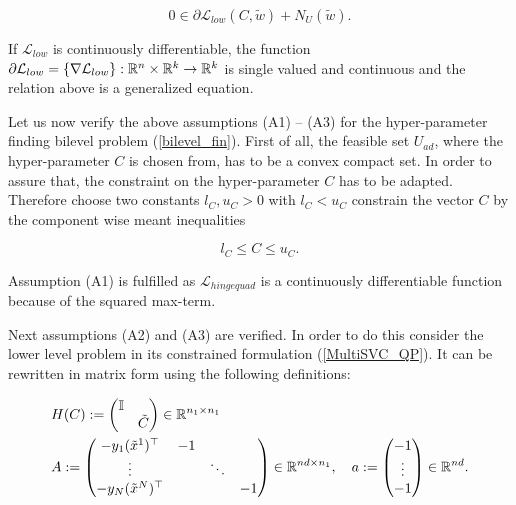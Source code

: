 \[ 0 \in \partial \mathcal{L}_{low}(C,\tilde{w}) + N_U(\tilde{w}). \]

If \(\mathcal{L}_{low}\) is continuously differentiable, the function \(\partial \mathcal{L}_{low} = \{\nabla \mathcal{L}_{low}\} : \mathbb{R}^n\times\mathbb{R}^k \to \mathbb{R}^k\) is single valued and continuous and the relation above is a generalized equation.


Let us now verify the above assumptions (A1) -- (A3) for the hyper-parameter finding bilevel problem (\ref{bilevel_fin}).
First of all, the feasible set \(U_{ad}\), where the hyper-parameter \(C\) is chosen from, has to be a convex compact set. In order to assure that, the constraint on the hyper-parameter \(C\) has to be adapted.
Therefore choose two constants \(l_C, u_C > 0\) with \(l_C < u_C\) constrain the vector \(C\) by the component wise meant inequalities

\[ l_C \leq C \leq u_C. \]

Assumption (A1) is fulfilled as \(\mathcal{L}_{hingequad}\) is a continuously differentiable function because of the squared max-term.

Next assumptions (A2) and (A3) are verified. In order to do this consider the lower level problem in its constrained formulation (\ref{MultiSVC_QP}).
It can be rewritten in matrix form using the following definitions:

\begin{equation*}
\begin{split}
	&H(C):= \begin{pmatrix} \mathbb{I} \\ & \tilde{C}\end{pmatrix}\in \mathbb{R}^{n_1\times n_1} \\
	&A := \begin{pmatrix}	-y_1(\tilde{x}^1)^{\top} & -1 \\
		\vdots & & \ddots \\ -y_N(\tilde{x}^N)^{\top} & & & -1\end{pmatrix} \in \mathbb{R}^{nd \times n_1}, \quad  a:= \begin{pmatrix}-1\\\vdots\\-1\end{pmatrix} \in \mathbb{R}^{nd}.
		\label{matrices}
\end{split}
\end{equation*}

